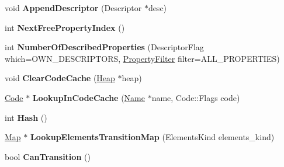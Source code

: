 \begin{DoxyCompactItemize}
\item 
void {\bfseries Append\+Descriptor} (Descriptor $\ast$desc)\hypertarget{classv8_1_1internal_1_1_map_ae32014fe26612f64ed211e33f15d2925}{}\label{classv8_1_1internal_1_1_map_ae32014fe26612f64ed211e33f15d2925}

\item 
int {\bfseries Next\+Free\+Property\+Index} ()\hypertarget{classv8_1_1internal_1_1_map_a6226e561bd8e9dcd09d3c432353cb535}{}\label{classv8_1_1internal_1_1_map_a6226e561bd8e9dcd09d3c432353cb535}

\item 
int {\bfseries Number\+Of\+Described\+Properties} (Descriptor\+Flag which=O\+W\+N\+\_\+\+D\+E\+S\+C\+R\+I\+P\+T\+O\+RS, \hyperlink{namespacev8_afbf02b6b1152a3e25d7bde90798209ac}{Property\+Filter} filter=A\+L\+L\+\_\+\+P\+R\+O\+P\+E\+R\+T\+I\+ES)\hypertarget{classv8_1_1internal_1_1_map_aac6b21cc217e50b40fa2c5329a7a605d}{}\label{classv8_1_1internal_1_1_map_aac6b21cc217e50b40fa2c5329a7a605d}

\item 
void {\bfseries Clear\+Code\+Cache} (\hyperlink{classv8_1_1internal_1_1_heap}{Heap} $\ast$heap)\hypertarget{classv8_1_1internal_1_1_map_ae056fb96f948796beaa380733e704d30}{}\label{classv8_1_1internal_1_1_map_ae056fb96f948796beaa380733e704d30}

\item 
\hyperlink{classv8_1_1internal_1_1_code}{Code} $\ast$ {\bfseries Lookup\+In\+Code\+Cache} (\hyperlink{classv8_1_1internal_1_1_name}{Name} $\ast$name, Code\+::\+Flags code)\hypertarget{classv8_1_1internal_1_1_map_a1f519718244cfbe894e1a6df41a5f251}{}\label{classv8_1_1internal_1_1_map_a1f519718244cfbe894e1a6df41a5f251}

\item 
int {\bfseries Hash} ()\hypertarget{classv8_1_1internal_1_1_map_a7bd1d0fad31420aa3f15db2727b7e74f}{}\label{classv8_1_1internal_1_1_map_a7bd1d0fad31420aa3f15db2727b7e74f}

\item 
\hyperlink{classv8_1_1internal_1_1_map}{Map} $\ast$ {\bfseries Lookup\+Elements\+Transition\+Map} (Elements\+Kind elements\+\_\+kind)\hypertarget{classv8_1_1internal_1_1_map_a1e058c851ca3232281e3eab6fc0ab7ca}{}\label{classv8_1_1internal_1_1_map_a1e058c851ca3232281e3eab6fc0ab7ca}

\item 
bool {\bfseries Can\+Transition} ()\hypertarget{classv8_1_1internal_1_1_map_a539d1405316167923c2c5380147e7074}{}\label{classv8_1_1internal_1_1_map_a539d1405316167923c2c5380147e7074}


\end{DoxyCompactItemize}
